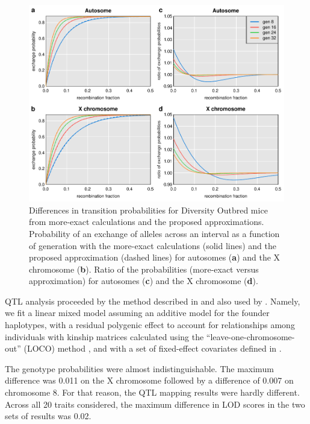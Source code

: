 \documentclass[12pt,letterpaper]{article}\usepackage[]{graphicx}\usepackage[table]{xcolor}
\begin{document}
\begin{figure}
\centering
\includegraphics[width=\textwidth]{Figs/fig2_do_trmatrix.pdf}

\caption{Differences in transition probabilities for Diversity
  Outbred mice from more-exact calculations and the proposed
  approximations. Probability of an exchange of alleles
  across an interval as a function of generation with the more-exact
  calculations (solid lines) and the proposed approximation (dashed
  lines) for
  autosomes (\textbf{a}) and the X chromosome (\textbf{b}).
  Ratio of the probabilities (more-exact versus approximation) for
  autosomes (\textbf{c}) and the X chromosome (\textbf{d}).
  \label{fig2_do_trmatrix}}
\end{figure}




QTL analysis proceeded by the method described in \citet{gatti2014}
and also used by \citet{albarghouthi2021}. Namely, we fit a linear
mixed model assuming an additive model for the founder haplotypes,
with a residual polygenic effect to account for relationships among
individuals with kinship matrices calculated using the
``leave-one-chromosome-out'' (LOCO) method \citep[see][]{yang2014},
and with a set of fixed-effect covariates defined in
\citet{albarghouthi2021}.

The genotype probabilities were almost indistinguishable. The maximum
difference was 0.011 on the
X chromosome followed by a difference of
0.007 on chromosome
8.
For that reason, the QTL mapping results were
hardly different. Across all 20 traits considered,
the maximum difference in LOD scores in the two sets of results was
0.02.
\end{document}

